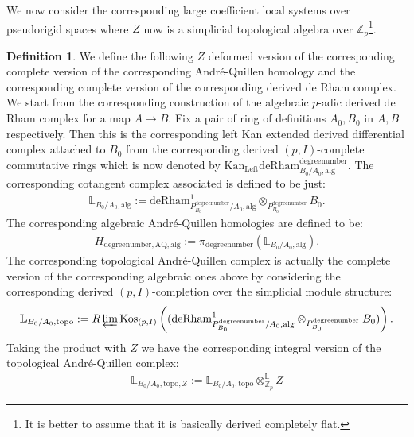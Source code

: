 \documentclass[11pt]{book}
\theoremstyle{definition}
\newtheorem{definition}[theorem]{Definition}
\numberwithin{equation}{section}
\begin{document}
\indent We now consider the corresponding large coefficient local systems over pseudorigid spaces where $Z$ now is a simplicial topological algebra over $\mathbb{Z}_p$\footnote{It is better to assume that it is basically derived completely flat.}.







\begin{definition}
We define the following $Z$ deformed version of the corresponding complete version of the corresponding Andr\'e-Quillen homology and the corresponding complete version of the corresponding derived de Rham complex. We start from the corresponding construction of the algebraic $p$-adic derived de Rham complex for a map $A\rightarrow B$. Fix a pair of ring of definitions $A_0,B_0$ in $A,B$ respectively. Then this is the corresponding left Kan extended derived differential complex attached to $B_0$ from the corresponding derived $(p,I)$-complete commutative rings which is now denoted by $\mathrm{Kan}_\mathrm{Left}\mathrm{deRham}^\text{degreenumber}_{B_0/A_0,\mathrm{alg}}$. The corresponding cotangent complex associated is defined to be just:
\begin{align}
\mathbb{L}_{B_0/A_0,\mathrm{alg}}:=	\mathrm{deRham}^1_{P^\text{degreenumber}_{B_0}/A_0,\mathrm{alg}}\otimes_{P^\text{degreenumber}_{B_0}} B_0.
\end{align}
The corresponding algebraic Andr\'e-Quillen homologies are defined to be:
\begin{align}
H_{\text{degreenumber},{\mathrm{AQ}},\mathrm{alg}}:=\pi_\text{degreenumber} (\mathbb{L}_{B_0/A_0,\mathrm{alg}}). 	
\end{align}
The corresponding topological Andr\'e-Quillen complex is actually the complete version of the corresponding algebraic ones above by considering the corresponding derived $(p,I)$-completion over the simplicial module structure:
\begin{align}
\mathbb{L}_{B_0/A_0,\mathrm{topo}}:=R\varprojlim \mathrm{Kos}_{(p,I)}	\left((\mathrm{deRham}^1_{P^\text{degreenumber}_{B_0}/A_0,\mathrm{alg}}\otimes_{P^\text{degreenumber}_{B_0}} B_0)\right).
\end{align}
Taking the product with $Z$ we have the corresponding integral version of the topological Andr\'e-Quillen complex:
\begin{align}
\mathbb{L}_{B_0/A_0,\mathrm{topo},Z}:=\mathbb{L}_{B_0/A_0,\mathrm{topo}}{\otimes}^\mathbb{L}_{\mathbb{Z}_p}Z
\end{align}

\end{definition}
\end{document}
